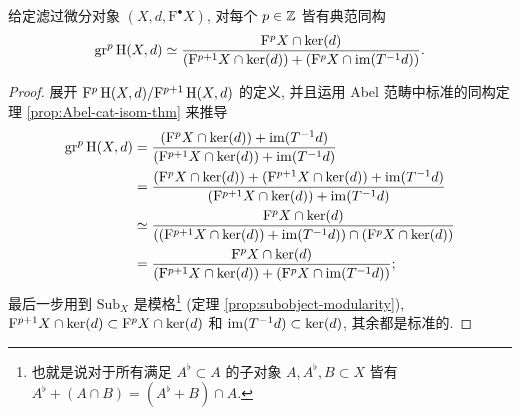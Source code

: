 \begin{lemma}\label{prop:induced-filtration-gr}
	给定滤过微分对象 $(X, d, \mathrm{F}^\bullet X)$, 对每个 $p \in \mathbb{Z}$ 皆有典范同构
	\[ \operatorname{gr}^p \operatorname{H}(X, d) \simeq \dfrac{\mathrm{F}^p X \cap \operatorname{ker}(d)}{ (\mathrm{F}^{p+1} X \cap \operatorname{ker}(d)) + (\mathrm{F}^p X \cap \operatorname{im}(T^{-1} d)) }. \]
\end{lemma}
\begin{proof}
	展开 $\mathrm{F}^p \operatorname{H}(X,d) / \mathrm{F}^{p+1} \operatorname{H}(X,d)$ 的定义, 并且运用 Abel 范畴中标准的同构定理 \ref{prop:Abel-cat-isom-thm} 来推导
	\begin{align*}
		\operatorname{gr}^p \operatorname{H}(X, d) & = \dfrac{(\mathrm{F}^p X \cap \operatorname{ker}(d)) + \operatorname{im}(T^{-1}d)}{(\mathrm{F}^{p+1} X \cap \operatorname{ker}(d)) + \operatorname{im}(T^{-1}d)} \\
		& = \dfrac{(\mathrm{F}^p X \cap \operatorname{ker}(d)) + (\mathrm{F}^{p+1} X \cap \operatorname{ker}(d)) + \operatorname{im}(T^{-1}d)}{(\mathrm{F}^{p+1} X \cap \operatorname{ker}(d)) + \operatorname{im}(T^{-1}d)} \\
		& \simeq \dfrac{\mathrm{F}^p X \cap \operatorname{ker}(d)}{ ((\mathrm{F}^{p+1} X \cap \operatorname{ker}(d)) + \operatorname{im}(T^{-1}d)) \cap (\mathrm{F}^p X \cap \operatorname{ker}(d)) } \\
		& = \dfrac{\mathrm{F}^p X \cap \operatorname{ker}(d)}{ (\mathrm{F}^{p+1} X \cap \operatorname{ker}(d)) + (\mathrm{F}^p X \cap \operatorname{im}(T^{-1} d)) };
	\end{align*}
	最后一步用到 $\mathrm{Sub}_X$ 是模格\footnote{也就是说对于所有满足 $A^\flat \subset A$ 的子对象 $A, A^\flat, B \subset X$ 皆有 $A^\flat + (A \cap B) = (A^\flat + B) \cap A$.} (定理 \ref{prop:subobject-modularity}), $\mathrm{F}^{p+1} X \cap \operatorname{ker}(d) \subset \mathrm{F}^p X \cap \operatorname{ker}(d)$ 和 $\operatorname{im}(T^{-1}d) \subset \operatorname{ker}(d)$, 其余都是标准的.
\end{proof}

